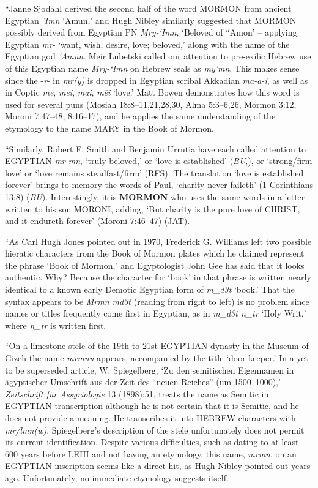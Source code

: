 			``Janne Sjodahl derived the second half of the word MORMON from ancient Egyptian \textit{'Imn} `Amun,' and Hugh Nibley similarly suggested that MORMON possibly derived from Egyptian PN \textit{Mry-`Imn}, `Beloved of ``Amon' -- applying Egyptian \textit{mr}- `want, wish, desire, love; beloved,' along with the name of the Egyptian god \textit{'Amun}. Meir Lubetski called our attention to pre-exilic Hebrew use of this Egyptian name \textit{Mry-`Imn} on Hebrew seals as \textit{my'mn}. This makes sense since the -\textit{r}- in \textit{mr(y)} is dropped in Egyptian scribal Akkadian \textit{ma-a-i}, as well as in Coptic \textit{me}, \textit{mei}, \textit{mai}, \textit{m\={e}i} `love.' Matt Bowen demonstrates how this word is used for several puns (Mosiah 18:8--11,21,28,30, Alma 5:3--6,26, Mormon 3:12, Moroni 7:47--48, 8:16--17), and he applies the same understanding of the etymology to the name MARY in the Book of Mormon.

			``Similarly, Robert F. Smith and Benjamin Urrutia have each called attention to \textsc{EGYPTIAN} \textit{mr mn}, `truly beloved,' or `love is established' (\textit{BU},), or `strong/firm love' or `love remains steadfast/firm' (RFS). The translation `love is established forever' brings to memory the words of Paul, `charity never faileth' (1 Corinthians 13:8) (\textit{BU}). Interestingly, it is \textbf{\textsc{MORMON}} who uses the same words in a letter written to his son MORONI, adding, `But charity is the pure love of CHRIST, and it endureth forever' (Moroni 7:46--47) (JAT).

			``As Carl Hugh Jones pointed out in 1970, Frederick G. Williams left two possible hieratic characters from the Book of Mormon plates which he claimed represent the phrase `Book of Mormon,' and Egyptologist John Gee has said that it looks authentic. Why? Because the character for `book' in that phrase is written nearly identical to a known early Demotic Egyptian form of \textit{m\_{d}3t} `book.' That the syntax appears to be \textit{Mrmn md3t} (reading from right to left) is no problem since names or titles frequently come first in Egyptian, as in \textit{m\_{d}3t n\_{t}r} `Holy Writ,' where \textit{n\_{t}r} is written first.

			``On a limestone stele of the 19th to 21st \textsc{EGYPTIAN} dynasty in the Museum of Gizeh the name \textit{mrmnu} appears, accompanied by the title `door keeper.' In a yet to be superseded article, W. Spiegelberg, `Zu den semitischen Eigennamen in ägyptischer Umschrift aus der Zeit des ``neuen Reiches'' (um 1500--1000),' \textit{Zeitschrift für Assyriologie} 13 (1898):51, treats the name as Semitic in \textsc{EGYPTIAN} transcription although he is not certain that it is Semitic, and he does not provide a meaning. He transcribes it into \textsc{HEBREW} characters with \textit{mr/lmn(w)}. Spiegelberg's description of the stele unfortunately does not permit its current identification. Despite various difficulties, such as dating to at least 600 years before \textsc{LEHI} and not having an etymology, this name, \textit{mrmn}, on an \textsc{EGYPTIAN} inscription seems like a direct hit, as Hugh Nibley pointed out years ago. Unfortunately, no immediate etymology suggests itself.

